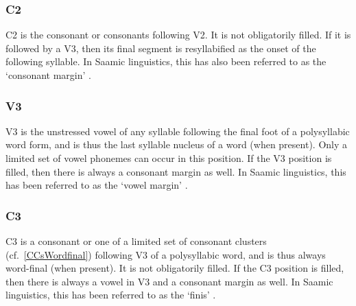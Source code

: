 \subsubsection{C2}\label{CMarg}
{C2} is the consonant or consonants following V2. It is not obligatorily filled. If it is followed by a V3, then its final segment is resyllabified as the onset of the following syllable. 
In Saamic linguistics, this has also been referred to as the ‘consonant margin’ \citep[cf.][39]{Sammallahti1998}.

\subsubsection{V3}\label{v3}
{V3} is the unstressed vowel of any syllable following the final foot of a polysyllabic word form, and is thus the last syllable nucleus of a word (when present). Only a limited set of vowel phonemes can occur in this position. If the V3 position is filled, then there is always a consonant margin as well.  
In Saamic linguistics, this has been referred to as the ‘vowel margin’ \citep[cf.][39]{Sammallahti1998}.

\subsubsection{C3}\label{c3}
{C3} is a consonant or one of a limited set of consonant clusters (cf.~\SEC\ref{CCsWordfinal}) following V3 of a polysyllabic word, and is thus always word-final (when present). It is not obligatorily filled. If the C3 position is filled, then there is always a vowel in V3 and a consonant margin as well. 
In Saamic linguistics, this has been referred to as the ‘finis’ \citep[cf.][39]{Sammallahti1998}.


